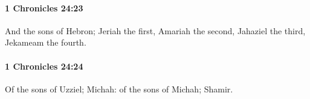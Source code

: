 		\paragraph{1 Chronicles 24:23} %
			\label{1CHRONICLES-24-23}

			And the sons of Hebron; Jeriah the first, Amariah the second, Jahaziel the third, Jekameam the fourth.


		\paragraph{1 Chronicles 24:24} %
			\label{1CHRONICLES-24-24}

			Of the sons of Uzziel; Michah: of the sons of Michah; Shamir.


